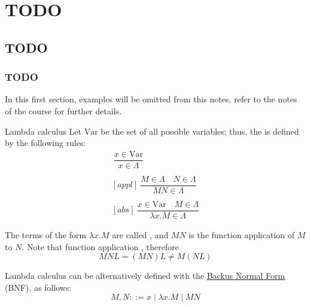 \documentclass[a4paper, 12pt]{report}
\institute{\curlyquotes{\hspace{0.25mm}Sapienza} Università di Roma}
\subtitle{Appunti integrati con il libro \book}
\author{\textit{Autore}\\\authorName}
\institute{\curlyquotes{\hspace{0.25mm}Sapienza} University of Rome}
\subtitle{Lecture notes integrated with the book \book}
\author{\textit{Author}\\\authorName}
\title{\courseName}
\date{\today}
\begin{document}
    \maketitle

    {
        \hypersetup{allcolors=black}

        \romantableofcontents
    }

    \introduction


    \chapter{TODO}

    \section{TODO}

    \subsection{TODO}
 
    In this first section, examples will be omitted from this notes, refer to the notes of the  course for further details. 

    \begin{frameddefn}[breakable]{Lambda calculus}
        Let $\mathrm{Var}$ be the set of all possible variables; thus, the  is defined by the following rules:
        \begin{gather*}
            [var] \ \dfrac{x \in \mathrm{Var}}{x \in \Lambda} \\ \\
            [appl] \ \dfrac{M \in \Lambda \quad N \in \Lambda}{M N \in \Lambda} \\ \\
            [abs] \ \dfrac{x \in \mathrm{Var} \quad M \in \Lambda}{\lambda x.M \in \Lambda}
        \end{gather*}

        The terms of the form $\lambda x.M$ are called , and $MN$ is the function application of $M$ to $N$. Note that function application , therefore $$MNL = (MN)L \neq M(NL)$$

        Lambda calculus can be alternatively defined with the \href{https://en.wikipedia.org/wiki/Backus%E2%80%93Naur_form}{Backus Normal Form} (BNF), as follows: $$M, N ::= x \mid \lambda x.M \mid M N$$
    \end{frameddefn}
\end{document}
